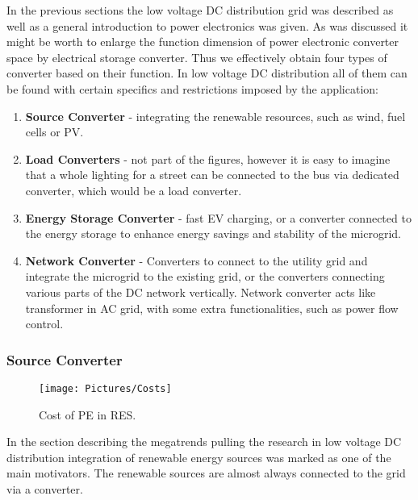 \documentclass[]{scrartcl}
\begin{document}
In the previous sections the low voltage DC distribution grid was described as well as a general introduction to power electronics was given. As was discussed it might be worth to enlarge the function dimension of power electronic converter space by electrical storage converter. Thus we effectively obtain four types of converter based on their function. In low voltage DC distribution all of them can be found with certain specifics and restrictions imposed by the application:

\begin{enumerate}
	\item \textbf{Source Converter }- integrating the renewable resources, such as wind, fuel cells or PV. 
	\item \textbf{Load Converters} - not part of the figures, however it is easy to imagine that a whole lighting for a street can be connected to the bus via dedicated converter, which would be a load converter. 
	\item \textbf{Energy Storage Converter } - fast EV charging, or a converter connected to the energy storage to enhance energy savings and stability of the microgrid.
	\item \textbf{Network Converter} - Converters to connect to the utility grid and integrate the microgrid to the existing grid, or the converters connecting various parts of the DC network vertically. Network converter acts like transformer in AC grid, with some extra functionalities, such as power flow control.
	
	\end{enumerate}
	\subsubsection{Source Converter}
	

\begin{wrapfigure}{r}{0.5\textwidth}
	\vspace{-20pt}
	\centering
	\texttt{[image: Pictures/Costs]}
	\vspace{-5pt}
	\caption{Cost of PE in RES.\cite{Chakraborty2009}}
	\vspace{-10pt}
	\label{fig:Costs}
\end{wrapfigure}


In the section describing the megatrends pulling the research in low voltage DC distribution integration of renewable energy sources was marked as one of the main motivators. The renewable sources are almost always connected to the grid via a converter. 
\end{document}
